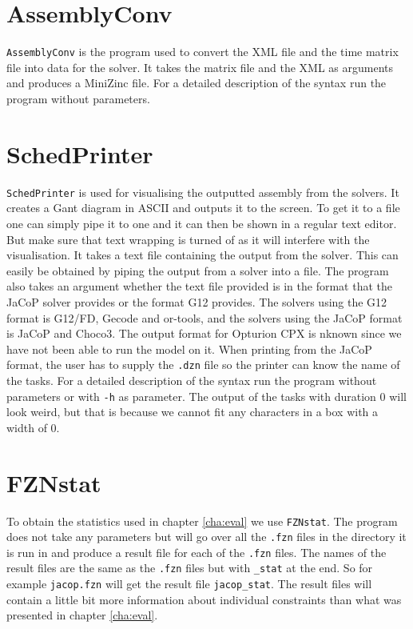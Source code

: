 \section{AssemblyConv}\label{sec:assemblyConv}
\texttt{AssemblyConv} is the program used to convert the XML file and the time matrix file into data for the solver. It takes the matrix file and the XML as arguments and produces a MiniZinc file. For a detailed description of the syntax run the program without parameters.

\section{SchedPrinter}
\texttt{SchedPrinter} is used for visualising the outputted assembly from the solvers. It creates a Gant diagram in ASCII and outputs it to the screen. To get it to a file one can simply pipe it to one and it can then be shown in a regular text editor. But make sure that text wrapping is turned of as it will interfere with the visualisation. It takes a text file containing the output from the solver. This can easily be obtained by piping the output from a solver into a file. The program also takes an argument whether the text file provided is in the format that the JaCoP solver provides or the format G12 provides. The solvers using the G12 format is G12/FD, Gecode and or-tools, and the solvers using the JaCoP format is JaCoP and Choco3. The output format for Opturion CPX is nknown since we have not been able to run the model on it. When printing from the JaCoP format, the user has to supply the \texttt{.dzn} file so the printer can know the name of the tasks. For a detailed description of the syntax run the program without parameters or with \texttt{-h} as parameter. The output of the tasks with duration 0 will look weird, but that is because we cannot fit any characters in a box with a width of 0.

\section{FZNstat}
To obtain the statistics used in chapter \ref{cha:eval} we use \texttt{FZNstat}. The program does not take any parameters but will go over all the \texttt{.fzn} files in the directory it is run in and produce a result file for each of the \texttt{.fzn} files. The names of the result files are the same as the \texttt{.fzn} files but with \texttt{\_stat} at the end. So for example \texttt{jacop.fzn} will get the result file \texttt{jacop\_stat}. The result files will contain a little bit more information about individual constraints than what was presented in chapter \ref{cha:eval}.